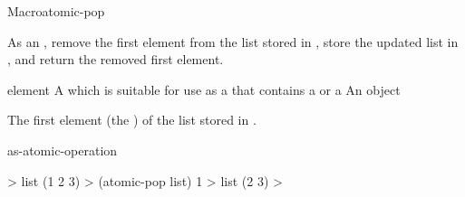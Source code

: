 \documentclass[10pt,twoside,english,pdftex]{article}
\begin{document}
\begin{functiondoc}{Macro}{atomic-pop}{ 
    }
%

\fnsyntax

\fnpurpose As an , remove the first element
from the list stored in , store the updated list in
, and return the removed first element.

\fnpackage {}

\fnmodule {}

\fnargs
\begin{args}{element}
\arg[place] A  which is suitable for use as a
   that contains a  or
   a 
\arg[element] An object
\end{args}

\fnreturns The first element (the ) of the list stored in
.

\begin{alsos}{as-atomic-operation}
\end{alsos}

\fnexample
%
\W\supp
\begin{example}
  > list
  (1 2 3)
  > (atomic-pop list)
  1
  > list
  (2 3)
  >
\end{example}

\end{functiondoc}

\end{document}
